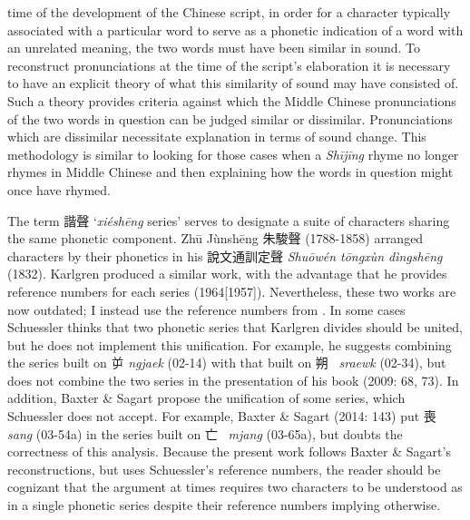 time of the development of the Chinese script, in order for a character
typically associated with a particular word to serve as a phonetic
indication of a word with an unrelated meaning, the two words must have
been similar in sound. To reconstruct pronunciations at the time of the
script's elaboration it is necessary to have an explicit theory of what
this similarity of sound may have consisted of. Such a theory provides
criteria against which the Middle Chinese pro­nun­ci­a­tions of the two
words in question can be judged similar or dissimilar. Pronunciations
which are dissimilar necessitate explanation in terms of sound change.
This methodology is similar to looking for those cases when a
 \emph{Shījīng} rhyme no longer rhymes in Middle Chinese and then
explaining how the words in question might once have rhymed.

The term 諧聲 `\emph{xiéshēng} series' serves to designate a suite of
characters sharing the same phonetic com­ponent. Zhū Jùnshēng 朱駿聲
(1788-1858) arranged characters by their phonetics in his 說文通訓定聲
 \emph{Shuōwén tōngxùn dìngshēng} (1832). Karlgren produced a similar
work, with the advantage that he provides reference numbers for each
series (1964{[}1957]). Nevertheless, these two works are now outdated;
I instead use the reference numbers from \citet[]{Schuessler2009minimal}.
In some
cases Schuessler thinks that two phonetic series that Karlgren divides
should be united, but he does not implement this unification. For
example, he suggests combining the series built on 屰 \emph{ngjaek}
(02-14) with that built on 朔~ \emph{sraewk} (02-34), but does not
combine the two series in the presentation of his book (2009: 68, 73).
In addition, Baxter \& Sagart propose the unification of some series,
which Schuessler does not accept. For example, Baxter \& Sagart (2014:
143) put 喪  \emph{sang} (03-54a) in the series built on 亡~ \emph{mjang}
(03-65a), but 
\citet[87]{Schuessler2009minimal}
doubts the correctness of this
analysis. Because the present work follows Baxter \& Sagart's
reconstructions, but uses Schuessler's reference numbers, the reader
should be cognizant that the argument at times requires two characters
to be understood as in a single phonetic series despite their reference
numbers implying otherwise.


